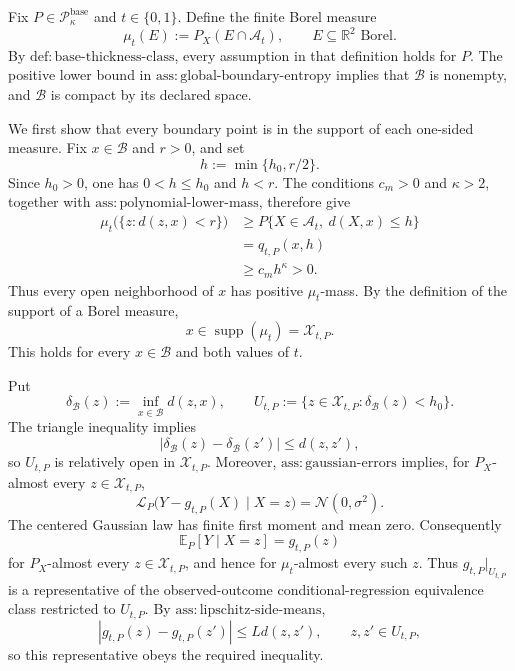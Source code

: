 Fix \(P\in\mathcal P_{\kappa}^{\mathrm{base}}\) and \(t\in\{0,1\}\).  Define the finite Borel measure
\[
\mu_t(E):=P_X(E\cap\mathcal A_t),\qquad E\subseteq\mathbb R^2\text{ Borel}.
\]
By \(\mathrm{def:base\text{-}thickness\text{-}class}\), every assumption in that definition holds for \(P\).
The positive lower bound in \(\mathrm{ass:global\text{-}boundary\text{-}entropy}\) implies that \(\mathcal B\) is nonempty, and \(\mathcal B\) is compact by its declared space.

We first show that every boundary point is in the support of each one-sided measure.  Fix \(x\in\mathcal B\) and \(r>0\), and set
\[
h:=\min\{h_0,r/2\}.
\]
Since \(h_0>0\), one has \(0<h\le h_0\) and \(h<r\).  The conditions \(c_m>0\) and \(\kappa>2\), together with \(\mathrm{ass:polynomial\text{-}lower\text{-}mass}\), therefore give
\[
\begin{aligned}
\mu_t\bigl(\{z:d(z,x)<r\}\bigr)
&\ge P\{X\in\mathcal A_t,\ d(X,x)\le h\}\\
&=q_{t,P}(x,h)\\
&\ge c_mh^{\kappa}>0.
\end{aligned}
\]
Thus every open neighborhood of \(x\) has positive \(\mu_t\)-mass.  By the definition of the support of a Borel measure,
\[
x\in\operatorname{supp}(\mu_t)=\mathcal X_{t,P}.
\]
This holds for every \(x\in\mathcal B\) and both values of \(t\).

Put
\[
\delta_{\mathcal B}(z):=\inf_{x\in\mathcal B}d(z,x),
\qquad
U_{t,P}:=\{z\in\mathcal X_{t,P}:\delta_{\mathcal B}(z)<h_0\}.
\]
The triangle inequality implies
\[
|\delta_{\mathcal B}(z)-\delta_{\mathcal B}(z')|\le d(z,z'),
\]
so \(U_{t,P}\) is relatively open in \(\mathcal X_{t,P}\).  Moreover, \(\mathrm{ass:gaussian\text{-}errors}\) implies, for \(P_X\)-almost every \(z\in\mathcal X_{t,P}\),
\[
\mathcal L_P\bigl(Y-g_{t,P}(X)\mid X=z\bigr)=\mathcal N(0,\sigma^2).
\]
The centered Gaussian law has finite first moment and mean zero.  Consequently
\[
\mathbb E_P[Y\mid X=z]=g_{t,P}(z)
\]
for \(P_X\)-almost every \(z\in\mathcal X_{t,P}\), and hence for \(\mu_t\)-almost every such \(z\).  Thus \(g_{t,P}|_{U_{t,P}}\) is a representative of the observed-outcome conditional-regression equivalence class restricted to \(U_{t,P}\).  By \(\mathrm{ass:lipschitz\text{-}side\text{-}means}\),
\[
|g_{t,P}(z)-g_{t,P}(z')|\le Ld(z,z'),
\qquad z,z'\in U_{t,P},
\]
so this representative obeys the required inequality.

